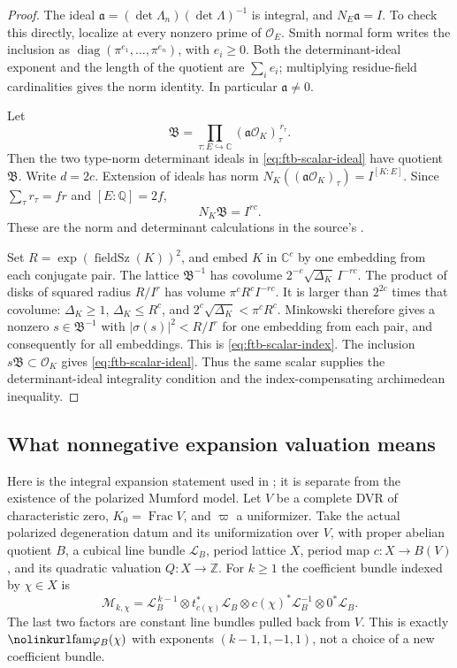 \begin{proof}
The ideal
\(\mathfrak a=(\det\Lambda_n)(\det\Lambda)^{-1}\) is integral,
and \(N_E\mathfrak a=I\).
To check this directly, localize at every nonzero prime of
\(\mathcal O_E\).  Smith normal form writes the inclusion as
\(\operatorname{diag}(\pi^{e_1},\ldots,\pi^{e_n})\), with \(e_i\ge0\).
Both the determinant-ideal exponent and the length of the quotient are
\(\sum_i e_i\); multiplying residue-field cardinalities gives the norm
identity.  In particular \(\mathfrak a\ne0\).

Let
\[
 \mathfrak B=\prod_{\tau:E\hookrightarrow\mathbb C}
          (\mathfrak a\mathcal O_K)_\tau^{\,r_\tau}.
\]
Then the two type-norm determinant ideals in
\eqref{eq:ftb-scalar-ideal} have quotient \(\mathfrak B\).
Write \(d=2c\).  Extension of ideals has norm
\(N_K((\mathfrak a\mathcal O_K)_\tau)=
 I^{[K:E]}\).  Since
\(\sum_\tau r_\tau=fr\) and \([E:\mathbb Q]=2f\),
\[
                 N_K\mathfrak B=I^{rc}.
\]
These are the norm and determinant calculations in the source's
.

Set \(R=\exp(\operatorname{fieldSz}(K))^2\), and embed \(K\) in
\(\mathbb C^c\) by one embedding from each conjugate pair.
The lattice \(\mathfrak B^{-1}\) has covolume
\(2^{-c}\sqrt{\Delta_K}\,I^{-rc}\).
The product of disks of squared radius \(R/I^r\) has volume
\(\pi^c R^c I^{-rc}\).
It is larger than \(2^{2c}\) times that covolume:
\(\Delta_K\ge1\),
\(\Delta_K\le R^c\), and
\(2^c\sqrt{\Delta_K}<\pi^cR^c\).
Minkowski therefore gives a nonzero
\(s\in\mathfrak B^{-1}\) with
\(|\sigma(s)|^2<R/I^r\) for one embedding from each pair,
and consequently for all embeddings.
This is \eqref{eq:ftb-scalar-index}.
The inclusion \(s\mathfrak B\subset\mathcal O_K\) gives
\eqref{eq:ftb-scalar-ideal}.
Thus the same scalar supplies the determinant-ideal integrality
condition and the index-compensating archimedean inequality.
\end{proof}

\subsection{What nonnegative expansion valuation means}
\label{subsec:ftb-expansion-regularity}

Here is the integral expansion statement used in
; it is separate from the
existence of the polarized Mumford model.
Let \(V\) be a complete DVR of characteristic zero, \(K_0=\operatorname{Frac}V\),
and \(\varpi\) a uniformizer.  Take the actual polarized degeneration
datum and its uniformization over \(V\), with proper abelian quotient
\(B\), a cubical line bundle \(\mathcal L_B\), period lattice \(X\),
period map \(c:X\to B(V)\), and its quadratic valuation \(Q:X\to\mathbb Z\).
For \(k\ge1\) the coefficient bundle indexed by \(\chi\in X\) is
\[
 \mathcal M_{k,\chi}=
  \mathcal L_B^{\,k-1}\otimes t_{c(\chi)}^*\mathcal L_B
       \otimes c(\chi)^*\mathcal L_B^{-1}
       \otimes 0^*\mathcal L_B .
\]
The last two factors are constant line bundles pulled back from \(V\).
This is exactly \(\srcid{fam}\varphi_B(\chi)\) with exponents
\((k-1,1,-1,1)\), not a choice of a new coefficient bundle.

